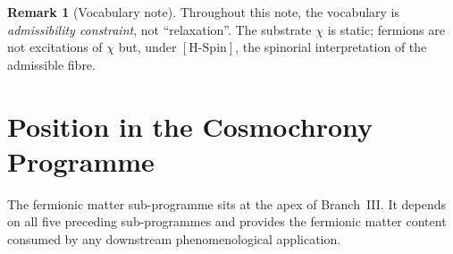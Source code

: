 \documentclass[11pt,a4paper]{article}
\theoremstyle{definition}
\newtheorem{remark}{Remark}
\newcommand{\HSpin}{\ensuremath{[\mathrm{H\text{-}Spin}]}}
\begin{document}
    \begin{remark}[Vocabulary note]
Throughout this note, the vocabulary is \emph{admissibility constraint}, not ``relaxation''.
The substrate $\chi$ is static; fermions are not excitations of $\chi$ but, under \HSpin{}, the spinorial
interpretation of the admissible fibre.
    \end{remark}

  \section{Position in the Cosmochrony Programme}
    \label{sec:position}

    The fermionic matter sub-programme sits at the apex of Branch~III.
    It depends on all five preceding sub-programmes and provides the fermionic matter
    content consumed by any downstream phenomenological application.
\end{document}
